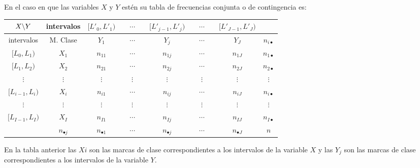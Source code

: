 \begin{frame}
En el caso en que las variables  $X$ y  $Y$ estén  su tabla de frecuencias conjunta o de contingencia es:

\begin{center}
\begin{tabular}{|c|c|c@{}c@{}c@{}c@{}c@{}c@{}c@{}c@{}c|c|}
\cline{1-11} $X  \mbox{\mbox{\textbackslash}}Y$ & intervalos & $[L'_0,L'_1)$ &
 & $\cdots$ &  & $[L'_{j-1},L'_j)$ &  &  $\cdots$ &
 & $[L'_{J-1},L'_J)$ & \multicolumn{1}{c}{} \\
\hline intervalos & M. Clase & $Y_1$  &  & $\cdots$ &  & $Y_j$ &  & $\cdots$ & & $Y_J$ & $n_{i\bullet}$ \\ 
\hline $[L_0,L_1)$ & $X_1$ & $n_{11}$  && $\cdots$ && $n_{1j}$ && $\cdots$ && $n_{1J}$ & $n_{1\bullet}$ \\
 $[L_1,L_2)$ & $X_2$ & $n_{21}$  && $\cdots$ && $n_{2j}$ && $\cdots$ && $n_{2J}$ & $n_{2\bullet}$\\ 
$\vdots$ & $\vdots$ & $\vdots$  && $\vdots$ && $\vdots$ && $\vdots$ && $\vdots$ & $\vdots$ \\
 $[L_{i-1},L_i)$ & $X_i$ & $n_{i1}$  && $\cdots$ && $n_{ij}$ && $\cdots$ && $n_{iJ}$ & $n_{i\bullet}$\\
 $\vdots$ & $\vdots$ & $\vdots$ && $\vdots$ && $\vdots$ && $\vdots$ && $\vdots$ & $\vdots$ \\
$[L_{I-1},L_I)$ & $X_I$ & $n_{I1}$ && $\cdots$ && $n_{Ij}$ && $\cdots$ && $n_{IJ}$ & $n_{I\bullet}$\\
 \hline \multicolumn{1}{c|}{} & {$n_{\bullet j}$} & $n_{\bullet 1}$  &&
$\cdots$ && $n_{\bullet j}$ && $\cdots$ && $n_{\bullet J}$ & $n$\\ \cline{2-12}
\end{tabular}
\end{center}
\end{frame}

\begin{frame}

En la tabla anterior las $Xi$ son las marcas de clase correspondientes a los intervalos
de la variable $X$ y las  $Y_j$  son las marcas de clase correspondientes a los
intervalos de la variable $Y$.
\end{frame}

